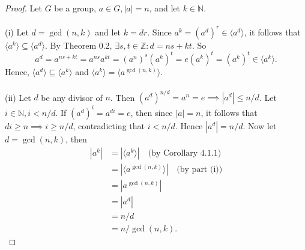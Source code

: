 \documentclass{article}
\theoremstyle{definition}
\begin{document}
\begin{proof}
    Let $G$ be a group, $a \in G, |a|=n$, and let $k \in \mathbb{N}$.
    \\ \\
    (i) Let $d=\gcd (n,k)$ and let $k=dr$. Since $a^k=(a^d)^r \in \langle a^d \rangle$, it follows that $\langle a^k \rangle \subseteq \langle a^d \rangle$. By Theorem 0.2, $\exists s,t \in \mathbb{Z}: d = ns+kt$. So
    \begin{equation*}
        a^d = a^{ns+kt} = a^{ns}a^{kt} = (a^n)^s(a^k)^t = e(a^k)^t = (a^k)^t \in \langle a^k \rangle.
    \end{equation*}
    Hence, $\langle a^d \rangle \subseteq \langle a^k \rangle$ and $\langle a^k \rangle = \langle a^{\gcd (n,k)} \rangle$.
    \\ \\
    (ii) Let $d$ be any divisor of $n$. Then $(a^d)^{n/d} = a^n = e \implies |a^d| \leq n/d$. Let $i \in \mathbb{N}, i < n/d$. If $(a^d)^i=a^{di}=e$, then since $|a|=n$, it follows that $di \geq n \implies i \geq n/d$, contradicting that $i<n/d$. Hence $|a^d|=n/d$. Now let $d = \gcd (n,k)$, then
    \begin{align*}
        |a^k| &= |\langle a^k \rangle| \quad \text{(by Corollary 4.1.1)} \\
        &= |\langle a^{\gcd (n,k)} \rangle| \quad \text{(by part (i))} \\
        &= |a^{\gcd (n,k)}| \\
        &= |a^d| \\
        &= n/d \\
        &= n/\gcd (n,k).
    \end{align*}
\end{proof}
\end{document}
